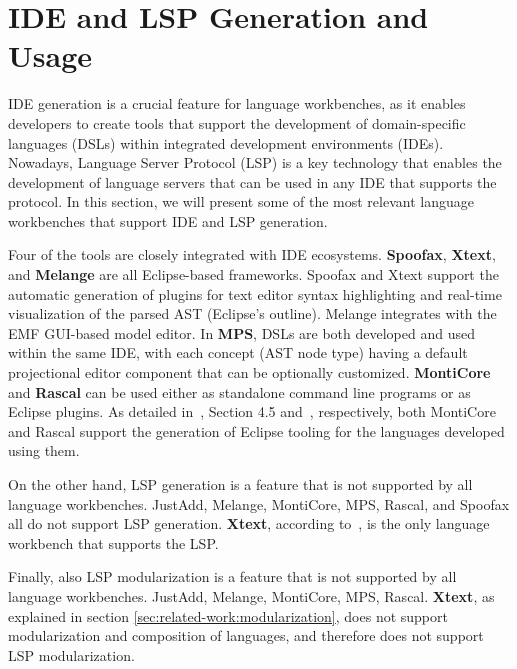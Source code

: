 \section{IDE and LSP Generation and Usage}\label{sec:related-work:ide-support}

IDE generation is a crucial feature for language workbenches, as it enables developers to create tools that support the development of domain-specific languages (DSLs) within integrated development environments (IDEs).
Nowadays, Language Server Protocol (LSP) is a key technology that enables the development of language servers that can be used in any IDE that supports the protocol. In this section, we will present some of the most relevant language workbenches that support IDE and LSP generation.

Four of the tools are closely integrated with IDE ecosystems. \textbf{Spoofax}, \textbf{Xtext}, and \textbf{Melange} are all Eclipse-based frameworks. Spoofax and Xtext support the automatic generation of plugins for text editor syntax highlighting and real-time visualization of the parsed AST (Eclipse’s outline). Melange integrates with the EMF GUI-based model editor. In \textbf{MPS}, DSLs are both developed and used within the same IDE, with each concept (AST node type) having a default projectional editor component that can be optionally customized. \textbf{MontiCore} and \textbf{Rascal} can be used either as standalone command line programs or as Eclipse plugins. As detailed in~\cite{Krahn10}, Section 4.5 and~\cite{Inostroza21}, respectively, both MontiCore and Rascal support the generation of Eclipse tooling for the languages developed using them.

On the other hand, LSP generation is a feature that is not supported by all language workbenches. JustAdd, Melange, MontiCore, MPS, Rascal, and Spoofax all do not support LSP generation. \textbf{Xtext}, according to~\cite{Bunder19a}, is the only language workbench that supports the LSP.

Finally, also LSP modularization is a feature that is not supported by all language workbenches. JustAdd, Melange, MontiCore, MPS, Rascal. \textbf{Xtext}, as explained in section \ref{sec:related-work:modularization}, does not support modularization and composition of languages, and therefore does not support LSP modularization.

